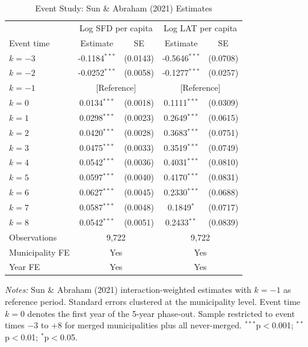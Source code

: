 \begin{table}[htbp]
\centering
\caption{Event Study: Sun \& Abraham (2021) Estimates}
\label{tab:event_study}
\begin{tabular}{lcccc}
\hline\hline
 & \multicolumn{2}{c}{Log SFD per capita} & \multicolumn{2}{c}{Log LAT per capita} \\
Event time & Estimate & SE & Estimate & SE \\
\hline
$k = -3$ & -0.1184$^{***}$ & (0.0143) & -0.5646$^{***}$ & (0.0708) \\
$k = -2$ & -0.0252$^{***}$ & (0.0058) & -0.1277$^{***}$ & (0.0257) \\
$k = -1$ & \multicolumn{2}{c}{[Reference]} & \multicolumn{2}{c}{[Reference]} \\
$k = 0$ & 0.0134$^{***}$ & (0.0018) & 0.1111$^{***}$ & (0.0309) \\
$k = 1$ & 0.0298$^{***}$ & (0.0023) & 0.2649$^{***}$ & (0.0615) \\
$k = 2$ & 0.0420$^{***}$ & (0.0028) & 0.3683$^{***}$ & (0.0751) \\
$k = 3$ & 0.0475$^{***}$ & (0.0033) & 0.3519$^{***}$ & (0.0749) \\
$k = 4$ & 0.0542$^{***}$ & (0.0036) & 0.4031$^{***}$ & (0.0810) \\
$k = 5$ & 0.0597$^{***}$ & (0.0040) & 0.4170$^{***}$ & (0.0831) \\
$k = 6$ & 0.0627$^{***}$ & (0.0045) & 0.2330$^{***}$ & (0.0688) \\
$k = 7$ & 0.0587$^{***}$ & (0.0048) & 0.1849$^{*}$ & (0.0717) \\
$k = 8$ & 0.0542$^{***}$ & (0.0051) & 0.2433$^{**}$ & (0.0839) \\
\hline
Observations & \multicolumn{2}{c}{9,722} & \multicolumn{2}{c}{9,722} \\
Municipality FE & \multicolumn{2}{c}{Yes} & \multicolumn{2}{c}{Yes} \\
Year FE & \multicolumn{2}{c}{Yes} & \multicolumn{2}{c}{Yes} \\
\hline\hline
\end{tabular}
\begin{tablenotes}
\item \textit{Notes:} Sun \& Abraham (2021) interaction-weighted estimates with $k = -1$ as reference period. Standard errors clustered at the municipality level. Event time $k = 0$ denotes the first year of the 5-year phase-out. Sample restricted to event times $-3$ to $+8$ for merged municipalities plus all never-merged. $^{***}$p$<$0.001; $^{**}$p$<$0.01; $^{*}$p$<$0.05.
\end{tablenotes}
\end{table}

